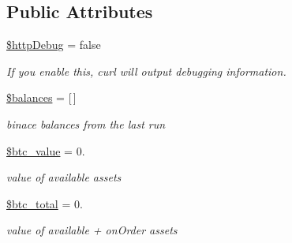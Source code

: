 \subsection*{Public Attributes}
\begin{DoxyCompactItemize}
\item 
\hyperlink{classBinance_1_1API_aaaf9a901342001f8734bfab6ba505205}{\$http\-Debug} = false
\begin{DoxyCompactList}\small\item\em If you enable this, curl will output debugging information. \end{DoxyCompactList}\item 
\hyperlink{classBinance_1_1API_a706b2458b10d731ea4918714c333a845}{\$balances} = \mbox{[}$\,$\mbox{]}
\begin{DoxyCompactList}\small\item\em binace balances from the last run \end{DoxyCompactList}\item 
\hyperlink{classBinance_1_1API_af80ef162a101ffa0963d977126d6811d}{\$btc\-\_\-value} = 0.
\begin{DoxyCompactList}\small\item\em value of available assets \end{DoxyCompactList}\item 
\hyperlink{classBinance_1_1API_a80f67dda302da9465596ad5e0bd86ce2}{\$btc\-\_\-total} = 0.
\begin{DoxyCompactList}\small\item\em value of available + on\-Order assets \end{DoxyCompactList}\end{DoxyCompactItemize}
